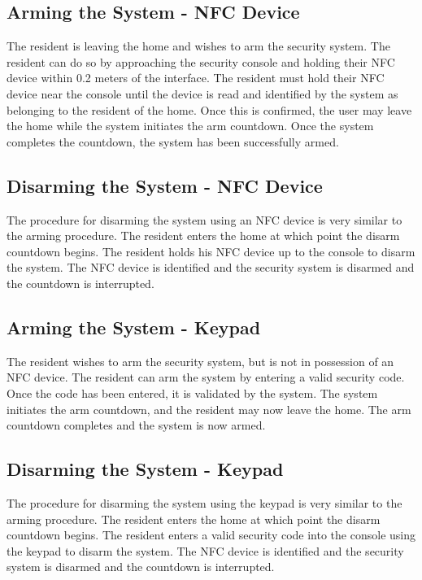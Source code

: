 \documentclass{report}
\begin{document}
\subsection*{Arming the System - NFC Device}

The resident is leaving the home and wishes to arm the security system. The resident can
do so by approaching the security console and holding their NFC device within 0.2 meters
of the interface. The resident must hold their NFC device near the console until the device
is read and identified by the system as belonging to the resident of the home. Once this is
confirmed, the user may leave the home while the system initiates the arm countdown. Once
the system completes the countdown, the system has been successfully armed.

\subsection*{Disarming the System - NFC Device}

The procedure for disarming the system using an NFC device is very similar to the arming
procedure. The resident enters the home at which point the disarm countdown begins. The
resident holds his NFC device up to the console to disarm the system. The NFC device is
identified and the security system is disarmed and the countdown is interrupted.

\subsection*{Arming the System - Keypad}

The resident wishes to arm the security system, but is not in possession of an NFC device.
The resident can arm the system by entering a valid security code. Once the code has been
entered, it is validated by the system. The system initiates the arm countdown, and the
resident may now leave the home. The arm countdown completes and the system is now armed.

\subsection*{Disarming the System - Keypad}

The procedure for disarming the system using the keypad is very similar to the arming
procedure. The resident enters the home at which point the disarm countdown begins. The
resident enters a valid security code into the console using the keypad to disarm the system. 
The NFC device is identified and the security system is disarmed and the countdown is interrupted.
\end{document}
